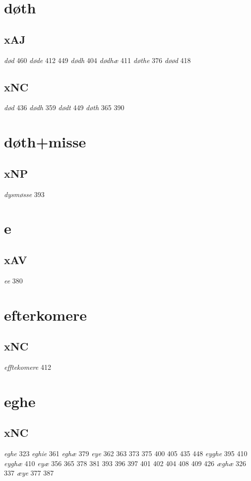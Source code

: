 \documentclass[a4paper,twocolumn]{article}
\begin{document}
\section{døth}
\label{sec:orge845cbe}
\subsection{xAJ}
\label{sec:orgd807d41}
\emph{død} 460 \emph{døde} 412 449 \emph{dødh} 404 \emph{dødhæ} 411 \emph{døthe} 376 \emph{døød} 418 
\subsection{xNC}
\label{sec:orgd787608}
\emph{død} 436 \emph{dødh} 359 \emph{dødt} 449 \emph{døth} 365 390 
\section{døth+misse}
\label{sec:orgdb36079}
\subsection{xNP}
\label{sec:org3f47690}
\emph{dysmøsse} 393 
\section{e}
\label{sec:orga7add6c}
\subsection{xAV}
\label{sec:org0859114}
\emph{ee} 380 
\section{efterkomere}
\label{sec:org6c6761d}
\subsection{xNC}
\label{sec:org558bdbe}
\emph{efftekomere} 412 
\section{eghe}
\label{sec:org5b1714e}
\subsection{xNC}
\label{sec:orgfba9ff4}
\emph{eghe} 323 \emph{eghie} 361 \emph{eghæ} 379 \emph{eye} 362 363 373 375 400 405 435 448 \emph{eyghe} 395 410 \emph{eyghæ} 410 \emph{eyæ} 356 365 378 381 393 396 397 401 402 404 408 409 426 \emph{æghæ} 326 337 \emph{æye} 377 387 
\end{document}
